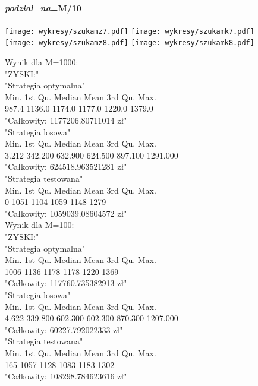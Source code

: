 \documentclass{article}
\begin{document}
\paragraph{\textit{podzial\_na}=M/10}
\begin{center}
\texttt{[image: wykresy/szukamz7.pdf]}
\texttt{[image: wykresy/szukamk7.pdf]}
\\
\texttt{[image: wykresy/szukamz8.pdf]}
\texttt{[image: wykresy/szukamk8.pdf]}
\end{center}

Wynik dla M=1000:\\
"ZYSKI:" \\
"Strategia optymalna" \\
Min. 1st Qu.  Median    Mean 3rd Qu.    Max.  \\
987.4  1136.0  1174.0  1177.0  1220.0  1379.0 \\ 
"Całkowity:  1177206.80711014 zł" \\
"Strategia losowa" \\
Min.  1st Qu.   Median     Mean  3rd Qu.     Max.  \\
3.212  342.200  632.900  624.500  897.100 1291.000  \\
"Całkowity:  624518.963521281 zł" \\
"Strategia testowana" \\
Min. 1st Qu.  Median    Mean 3rd Qu.    Max.  \\
0    1051    1104    1059    1148    1279 \\ 
"Całkowity:  1059039.08604572 zł" \\


Wynik dla M=100:\\
"ZYSKI:" \\
"Strategia optymalna" \\
Min. 1st Qu.  Median    Mean 3rd Qu.    Max.  \\
1006    1136    1178    1178    1220    1369 \\ 
"Całkowity:  117760.735382913 zł" \\
"Strategia losowa" \\
Min.  1st Qu.   Median     Mean  3rd Qu.     Max.  \\
4.622  339.800  602.300  602.300  870.300 1207.000  \\
"Całkowity:  60227.792022333 zł" \\
"Strategia testowana" \\
Min. 1st Qu.  Median    Mean 3rd Qu.    Max.  \\
165    1057    1128    1083    1183    1302 \\ 
"Całkowity:  108298.784623616 zł" \\
\end{document}
